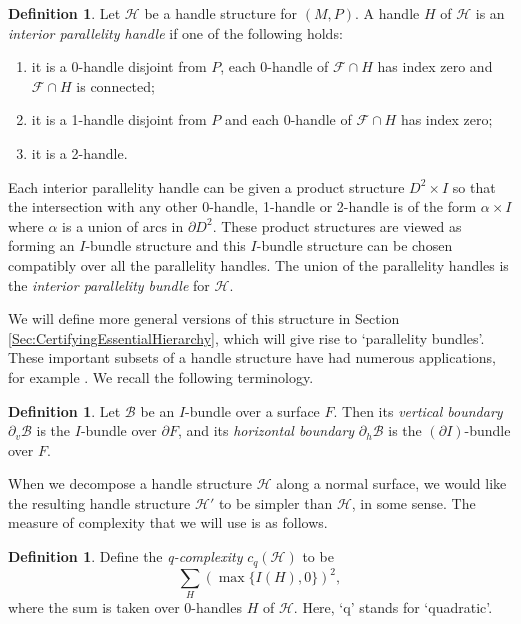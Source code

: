 \documentclass[oneside]{amsart}
\numberwithin{equation}{section}
\theoremstyle{plain}
\theoremstyle{definition}
\newtheorem{definition}[equation]{Definition}
\begin{document}
\begin{definition}
Let $\mathcal{H}$ be a handle structure for $(M,P)$. A handle $H$ of $\mathcal{H}$ is an \emph{interior parallelity handle} if one of the following holds:
\begin{enumerate} 
\item it is a 0-handle disjoint from $P$, each 0-handle of $\mathcal{F} \cap H$ has index zero and $\mathcal{F} \cap H$ is connected;
\item it is a 1-handle disjoint from $P$ and each 0-handle of $\mathcal{F} \cap H$ has index zero;
\item it is a 2-handle.
\end{enumerate}
Each interior parallelity handle can be given a product structure $D^2 \times I$ so that the intersection with any other 0-handle, 1-handle or 2-handle is of the form $\alpha \times I$ where $\alpha$ is a union of arcs in $\partial D^2$. These product structures are viewed as forming an $I$-bundle structure and this $I$-bundle structure can be chosen compatibly over all the parallelity handles. The union of the parallelity handles is the \emph{interior parallelity bundle} for $\mathcal{H}$.
\end{definition}

We will define more general versions of this structure in Section \ref{Sec:CertifyingEssentialHierarchy}, which will give rise to `parallelity bundles'. These important subsets of a handle structure have had numerous applications, for example \cite{Lackenby:Composite}. We recall the following terminology.

\begin{definition} 
Let $\mathcal{B}$ be an $I$-bundle over a surface $F$. Then its \emph{vertical boundary} $\partial_v \mathcal{B}$ is the $I$-bundle over $\partial F$, and its \emph{horizontal boundary} $\partial_h \mathcal{B}$ is the $(\partial I)$-bundle over $F$.
\end{definition}

When we decompose a handle structure $\mathcal{H}$ along a normal surface, we would like the resulting handle structure $\mathcal{H}'$ to be simpler than $\mathcal{H}$, in some sense. The measure of complexity that we will use is as follows.

\begin{definition}
Define the \emph{q-complexity} $c_q(\mathcal{H})$ to be 
$$\sum_H (\max \{I(H), 0\})^2,$$ where the sum is taken over 0-handles $H$ of $\mathcal{H}$. Here, `q' stands for `quadratic'.
\end{definition}
\end{document}
